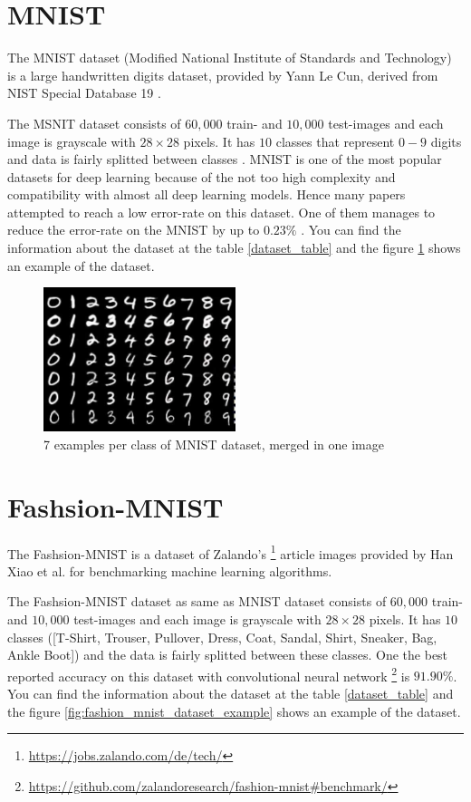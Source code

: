 \section{MNIST}
The MNIST dataset (Modified National Institute of Standards and Technology) is a large handwritten
digits dataset, provided by Yann Le Cun, derived from NIST Special Database 19 \cite{NIST}.

The MSNIT dataset consists of $60,000$ train- and $10,000$ test-images and each image is grayscale
with $28 \times 28$ pixels. It has $10$ classes that represent $0-9$ digits and data is fairly
splitted between classes \cite{MNIST_data_reference}. MNIST is one of the most popular datasets for
deep learning because of the not too high complexity and compatibility with almost all deep learning
models. Hence many papers attempted to reach a low error-rate on this dataset. One of them manages
to reduce the error-rate on the MNIST by up to $0.23\%$ \cite{MNIST_best_result_reference}. You can
find the information about the dataset at the table
\ref{dataset_table} and the figure \ref{fig:mnist_dataset_example} shows an example of the dataset.

\begin{figure}
  \centering
  \label{fig:mnist_dataset_example}
  \includegraphics[width=0.5\textwidth]{fig/mnist}
  \caption{7 examples per class of MNIST dataset, merged in one image \cite{MNIST_dataset_example}}
\end{figure}


\section{Fashsion-MNIST}
The Fashsion-MNIST is a dataset of Zalando's \footnote{\url{https://jobs.zalando.com/de/tech/}}
article images provided by Han Xiao et al. \cite{Fashion_MNIST_reference} for benchmarking machine learning algorithms. 

The Fashsion-MNIST dataset as same as MNIST dataset consists of $60,000$ train- and $10,000$ test-images and each image is grayscale
with $28 \times 28$ pixels. It has $10$ classes ([T-Shirt, Trouser, Pullover, Dress, Coat,
Sandal, Shirt, Sneaker, Bag, Ankle Boot]) and the data is fairly
splitted between these classes. One the best reported accuracy on this dataset with convolutional neural
network \footnote{\url{https://github.com/zalandoresearch/fashion-mnist\#benchmark/}} is $91.90\%$. You can
find the information about the dataset at the table
\ref{dataset_table} and the figure \ref{fig:fashion_mnist_dataset_example} shows an example of the dataset.


